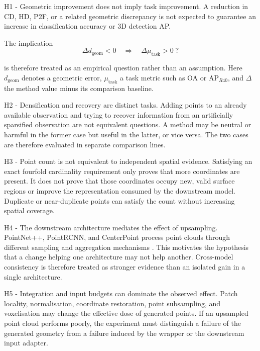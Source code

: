 H1 - Geometric improvement does not imply task improvement. A reduction in CD, HD, P2F, or a related geometric discrepancy is not expected to guarantee an increase in classification accuracy or 3D detection AP.

\begin{samepage}
The implication
\begin{equation}
\Delta d_{\mathrm{geom}}<0\quad\Longrightarrow\quad\Delta\mu_{\mathrm{task}}>0\;?
\label{eq:fc-3-2}
\end{equation}
\end{samepage}

is therefore treated as an empirical question rather than an assumption. Here $d_{\mathrm{geom}}$ denotes a geometric error, $\mu_{\mathrm{task}}$ a task metric such as OA or AP$_{R40}$, and $\Delta$ the method value minus its comparison baseline.

H2 - Densification and recovery are distinct tasks. Adding points to an already available observation and trying to recover information from an artificially sparsified observation are not equivalent questions. A method may be neutral or harmful in the former case but useful in the latter, or vice versa. The two cases are therefore evaluated in separate comparison lines.

H3 - Point count is not equivalent to independent spatial evidence. Satisfying an exact fourfold cardinality requirement only proves that more coordinates are present. It does not prove that those coordinates occupy new, valid surface regions or improve the representation consumed by the downstream model. Duplicate or near-duplicate points can satisfy the count without increasing spatial coverage.

H4 - The downstream architecture mediates the effect of upsampling. PointNet++, PointRCNN, and CenterPoint process point clouds through different sampling and aggregation mechanisms \cite{qi2017pointnetpp,shi2019pointrcnn,yin2021centerpoint}. This motivates the hypothesis that a change helping one architecture may not help another. Cross-model consistency is therefore treated as stronger evidence than an isolated gain in a single architecture.

H5 - Integration and input budgets can dominate the observed effect. Patch locality, normalisation, coordinate restoration, point subsampling, and voxelisation may change the effective dose of generated points. If an upsampled point cloud performs poorly, the experiment must distinguish a failure of the generated geometry from a failure induced by the wrapper or the downstream input adapter.

